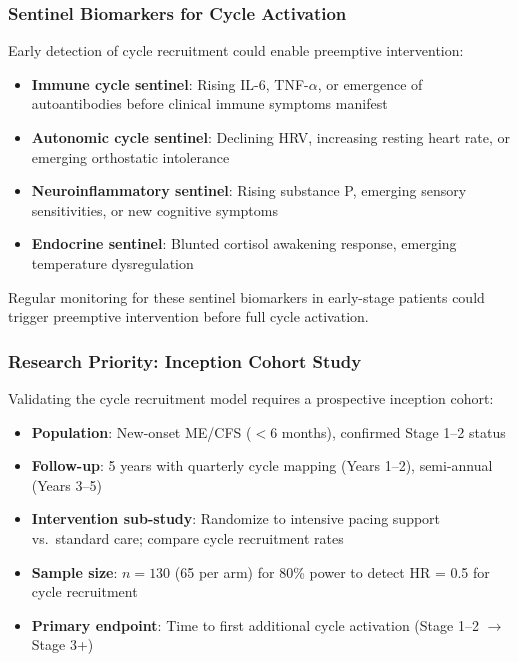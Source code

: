 \subsubsection{Sentinel Biomarkers for Cycle Activation}

Early detection of cycle recruitment could enable preemptive intervention:

\begin{itemize}
    \item \textbf{Immune cycle sentinel}: Rising IL-6, TNF-$\alpha$, or emergence of autoantibodies before clinical immune symptoms manifest
    \item \textbf{Autonomic cycle sentinel}: Declining HRV, increasing resting heart rate, or emerging orthostatic intolerance
    \item \textbf{Neuroinflammatory sentinel}: Rising substance P, emerging sensory sensitivities, or new cognitive symptoms
    \item \textbf{Endocrine sentinel}: Blunted cortisol awakening response, emerging temperature dysregulation
\end{itemize}

Regular monitoring for these sentinel biomarkers in early-stage patients could trigger preemptive intervention before full cycle activation.

\subsubsection{Research Priority: Inception Cohort Study}

Validating the cycle recruitment model requires a prospective inception cohort:

\begin{itemize}
    \item \textbf{Population}: New-onset ME/CFS ($<$6 months), confirmed Stage 1--2 status
    \item \textbf{Follow-up}: 5 years with quarterly cycle mapping (Years 1--2), semi-annual (Years 3--5)
    \item \textbf{Intervention sub-study}: Randomize to intensive pacing support vs.\ standard care; compare cycle recruitment rates
    \item \textbf{Sample size}: $n = 130$ (65 per arm) for 80\% power to detect HR = 0.5 for cycle recruitment
    \item \textbf{Primary endpoint}: Time to first additional cycle activation (Stage 1--2 $\rightarrow$ Stage 3+)
\end{itemize}

